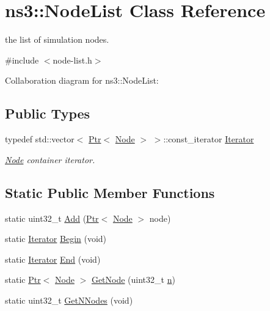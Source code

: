 \hypertarget{classns3_1_1NodeList}{}\section{ns3\+:\+:Node\+List Class Reference}
\label{classns3_1_1NodeList}


the list of simulation nodes.  




{\ttfamily \#include $<$node-\/list.\+h$>$}



Collaboration diagram for ns3\+:\+:Node\+List\+:
\subsection*{Public Types}
\begin{DoxyCompactItemize}
\item 
typedef std\+::vector$<$ \hyperlink{classns3_1_1Ptr}{Ptr}$<$ \hyperlink{classns3_1_1Node}{Node} $>$ $>$\+::const\+\_\+iterator \hyperlink{classns3_1_1NodeList_a9e2679a94efb4f0066cc21e65440364d}{Iterator}
\begin{DoxyCompactList}\small\item\em \hyperlink{classns3_1_1Node}{Node} container iterator. \end{DoxyCompactList}\end{DoxyCompactItemize}
\subsection*{Static Public Member Functions}
\begin{DoxyCompactItemize}
\item 
static uint32\+\_\+t \hyperlink{classns3_1_1NodeList_a92f9b44065e4f643bf8071a30ccddff6}{Add} (\hyperlink{classns3_1_1Ptr}{Ptr}$<$ \hyperlink{classns3_1_1Node}{Node} $>$ node)
\item 
static \hyperlink{classns3_1_1NodeList_a9e2679a94efb4f0066cc21e65440364d}{Iterator} \hyperlink{classns3_1_1NodeList_a93d2211831f5cb71d1dbb721e2721d7f}{Begin} (void)
\item 
static \hyperlink{classns3_1_1NodeList_a9e2679a94efb4f0066cc21e65440364d}{Iterator} \hyperlink{classns3_1_1NodeList_a027a558c16e6078e25c7ffc67becb559}{End} (void)
\item 
static \hyperlink{classns3_1_1Ptr}{Ptr}$<$ \hyperlink{classns3_1_1Node}{Node} $>$ \hyperlink{classns3_1_1NodeList_a80ac09977d48d29db5c704ac8483cf6c}{Get\+Node} (uint32\+\_\+t \hyperlink{lte__link__budget__x2__handover__measures_8m_abdb05bc5a064cf642a06c83b3392f148}{n})
\item 
static uint32\+\_\+t \hyperlink{classns3_1_1NodeList_a1d110b1670005895dd5812baab13682a}{Get\+N\+Nodes} (void)
\end{DoxyCompactItemize}


